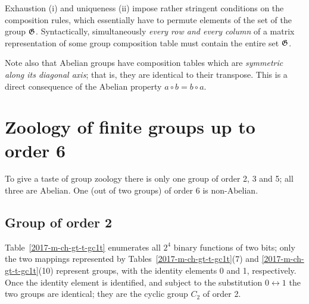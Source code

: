 Exhaustion (i) and uniqueness (ii) impose rather stringent conditions on the composition rules,
which essentially have to permute elements of the set of the group ${\frak G}$.
Syntactically,  simultaneously {\em every row and every column} of a matrix representation of some group composition table
must contain the entire set ${\frak G}$.

Note also that Abelian groups have composition tables which are {\em symmetric along its diagonal axis}; that is, they are identical to their transpose. This is a direct consequence
of the Abelian property $a \circ b = b \circ a$.


\section{Zoology of finite groups up to order 6}
To give a taste of group zoology there is only one group of order 2, 3 and 5; all three are Abelian. One (out of two groups) of order 6 is non-Abelian.

\subsection {Group of order 2}

Table~\ref{2017-m-ch-gt-t-gc1t}
enumerates all $2^4$ binary functions of two bits;
only the two mappings represented by Tables~\ref{2017-m-ch-gt-t-gc1t}(7) and \ref{2017-m-ch-gt-t-gc1t}(10) represent groups,
with the identity elements 0 and 1, respectively. Once the identity element is identified, and subject to the substitution $0 \leftrightarrow 1$
the two groups are identical; they are the cyclic group $C_2$ of order 2.

